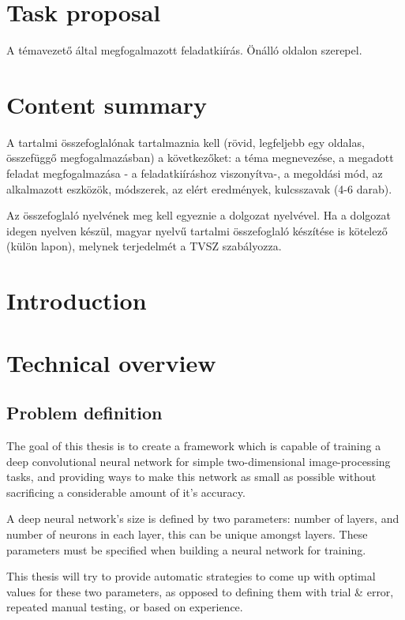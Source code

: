\documentclass[12pt]{report}
\begin{document}
\tableofcontents

\chapter*{Task proposal}

A témavezető által megfogalmazott feladatkiírás. Önálló oldalon szerepel.

\chapter*{Content summary}

A tartalmi összefoglalónak tartalmaznia kell (rövid, legfeljebb egy oldalas, összefüggő megfogalmazásban)
a következőket: a téma megnevezése, a megadott feladat megfogalmazása - a feladatkiíráshoz viszonyítva-,
a megoldási mód, az alkalmazott eszközök, módszerek, az elért eredmények, kulcsszavak (4-6 darab).

Az összefoglaló nyelvének meg kell egyeznie a dolgozat nyelvével. Ha a dolgozat idegen nyelven készül,
magyar nyelvű tartalmi összefoglaló készítése is kötelező (külön lapon), melynek terjedelmét a TVSZ szabályozza.

\chapter*{Introduction}

\chapter{Technical overview}
\section{Problem definition}
The goal of this thesis is to create a framework which is capable of training a deep convolutional neural network for simple two-dimensional image-processing tasks, and providing ways to make this network as small as possible without sacrificing a considerable amount of it's accuracy.\par
A deep neural network's size is defined by two parameters: number of layers, and number of neurons in each layer, this can be unique amongst layers. These parameters must be specified when building a neural network for training.\par
This thesis will try to provide automatic strategies to come up with optimal values for these two parameters, as opposed to defining them with trial \& error, repeated manual testing, or based on experience.
\end{document}
